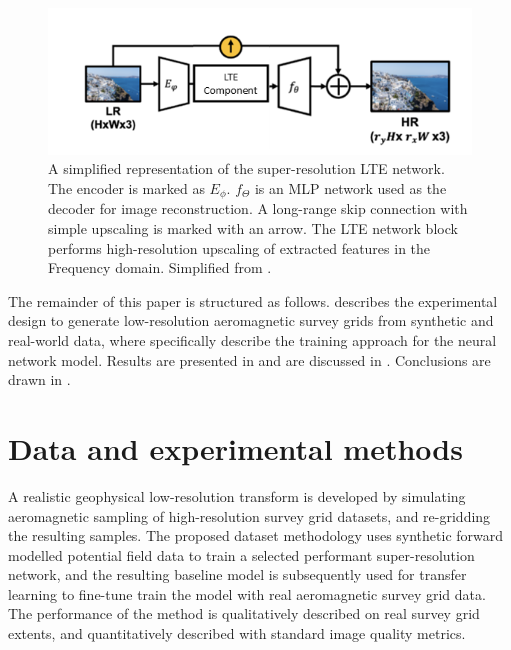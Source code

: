 \begin{figure}[hbtp]
    \includegraphics[width=\linewidth]{fig/p2/temp_lte.png}
    \caption[The LTE architecture]{
        A simplified representation of the super-resolution LTE network.
        The encoder is marked as \(E_\phi{}\).
        \(f_\Theta{}\) is an MLP network used as the decoder for image reconstruction.
        A long-range skip connection with simple upscaling is marked with an arrow.
        The LTE network block performs high-resolution upscaling of extracted features in the Frequency domain.
        Simplified from \textcite{leeLocalTextureEstimator2022}.
    }
    \label{fig:ltenet}
\end{figure}

The remainder of this paper is structured as follows.
 describes the experimental design to generate low-resolution aeromagnetic survey grids from synthetic and real-world data, where  specifically describe the training approach for the neural network model.
Results are presented in  and are discussed in .
Conclusions are drawn in .

\section{Data and experimental methods}
\label{sec:2methods}
A realistic geophysical low-resolution transform is developed by simulating aeromagnetic sampling of high-resolution survey grid datasets, and re-gridding the resulting samples.
The proposed dataset methodology uses synthetic forward modelled potential field data to train a selected performant super-resolution network, and the resulting baseline model is subsequently used for transfer learning to fine-tune train the model with real aeromagnetic survey grid data.
The performance of the method is qualitatively described on real survey grid extents, and quantitatively described with standard image quality metrics.


